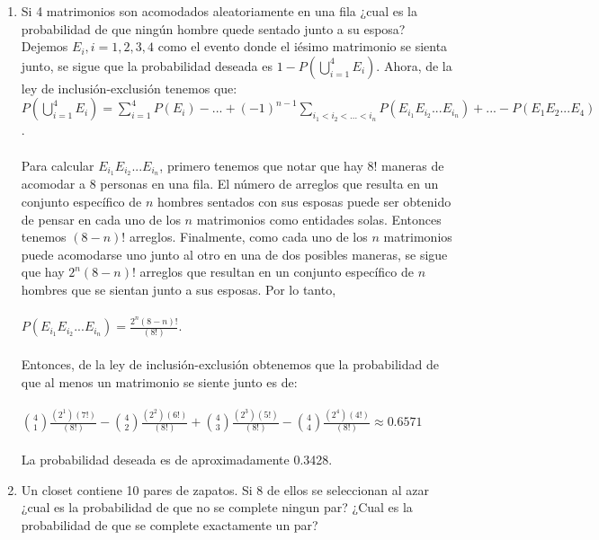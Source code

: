 \documentclass[12pt,a4paper]{report}
\begin{document}
\begin{enumerate}
{  }


  \item{
Si 4 matrimonios son acomodados aleatoriamente en una fila ¿cual es la probabilidad de que ningún hombre quede sentado junto a su esposa?\\

Dejemos $E_{i}, i= 1,2,3,4$ como el evento donde el iésimo matrimonio se sienta junto, se sigue que la probabilidad deseada es $1 - P(\bigcup\limits_{i=1}^{4}E_{i})$. Ahora, de la ley de inclusión-exclusión tenemos que:
\\$P(\bigcup\limits_{i=1}^{4}E_{i}) = \sum_{i=1}^{4} P(E_{i}) - ... + (-1)^{n-1}\sum_{i_{1} < i_{2} < ... < i_{n}}P(E_{i_{1}}E_{i_{2}}...E_{i_{n}}) + ... - P(E_{1}E_{2}...E_{4})$.\\
\\Para calcular $E_{i_{1}}E_{i_{2}}...E_{i_{n}}$, primero tenemos que notar que hay 8! maneras de acomodar a 8 personas en una fila. El número de arreglos que resulta en un conjunto específico de $n$ hombres sentados con sus esposas puede ser obtenido de pensar en cada uno de los $n$ matrimonios como entidades solas. Entonces tenemos $(8-n)!$ arreglos. Finalmente, como cada uno de los $n$ matrimonios puede acomodarse uno junto al otro en una de dos posibles maneras, se sigue que hay $2^n(8-n)!$ arreglos que resultan en un conjunto específico de $n$ hombres que se sientan junto a sus esposas. Por lo tanto,\\
\\$P(E_{i_{1}}E_{i_{2}}...E_{i_{n}}) = \frac{2^n(8-n)!}{(8!)}$.\\
\\Entonces, de la ley de inclusión-exclusión obtenemos que la probabilidad de que al menos un matrimonio se siente junto es de:\\
\\$ {4 \choose 1}\frac{(2^1)(7!)}{(8!)} - {4 \choose 2}\frac{(2^2)(6!)}{(8!)} + {4 \choose 3}\frac{(2^3)(5!)}{(8!)} - {4 \choose 4}\frac{(2^4)(4!)}{(8!)} \approx 0.6571$\\
\\La probabilidad deseada es de aproximadamente 0.3428.

  }

  \item{
	Un closet contiene 10 pares de zapatos. Si 8 de ellos se seleccionan al
	azar ¿cual es la probabilidad de que no se complete ningun par? ¿Cual es la
	probabilidad de que se complete exactamente un par?

}
\end{enumerate}
\end{document}
